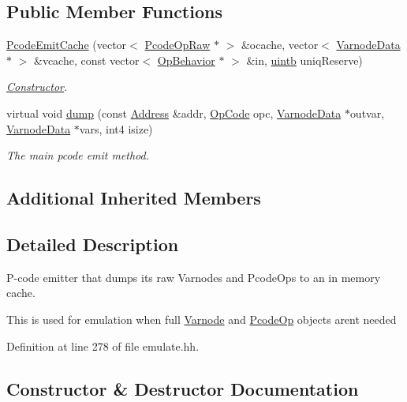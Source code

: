 \subsection*{Public Member Functions}
\begin{DoxyCompactItemize}
\item 
\mbox{\hyperlink{class_pcode_emit_cache_a478720d9338eec8533c3450c5b216781}{Pcode\+Emit\+Cache}} (vector$<$ \mbox{\hyperlink{class_pcode_op_raw}{Pcode\+Op\+Raw}} $\ast$ $>$ \&ocache, vector$<$ \mbox{\hyperlink{struct_varnode_data}{Varnode\+Data}} $\ast$ $>$ \&vcache, const vector$<$ \mbox{\hyperlink{class_op_behavior}{Op\+Behavior}} $\ast$ $>$ \&in, \mbox{\hyperlink{types_8h_a2db313c5d32a12b01d26ac9b3bca178f}{uintb}} uniq\+Reserve)
\begin{DoxyCompactList}\small\item\em \mbox{\hyperlink{class_constructor}{Constructor}}. \end{DoxyCompactList}\item 
virtual void \mbox{\hyperlink{class_pcode_emit_cache_a493e849e384f3a63cbf1676c43d6bbe1}{dump}} (const \mbox{\hyperlink{class_address}{Address}} \&addr, \mbox{\hyperlink{opcodes_8hh_abeb7dfb0e9e2b3114e240a405d046ea7}{Op\+Code}} opc, \mbox{\hyperlink{struct_varnode_data}{Varnode\+Data}} $\ast$outvar, \mbox{\hyperlink{struct_varnode_data}{Varnode\+Data}} $\ast$vars, int4 isize)
\begin{DoxyCompactList}\small\item\em The main pcode emit method. \end{DoxyCompactList}\end{DoxyCompactItemize}
\subsection*{Additional Inherited Members}


\subsection{Detailed Description}
P-\/code emitter that dumps its raw Varnodes and Pcode\+Ops to an in memory cache. 

This is used for emulation when full \mbox{\hyperlink{class_varnode}{Varnode}} and \mbox{\hyperlink{class_pcode_op}{Pcode\+Op}} objects aren\textquotesingle{}t needed 

Definition at line 278 of file emulate.\+hh.



\subsection{Constructor \& Destructor Documentation}
\mbox{\label{class_pcode_emit_cache_a478720d9338eec8533c3450c5b216781}} 
